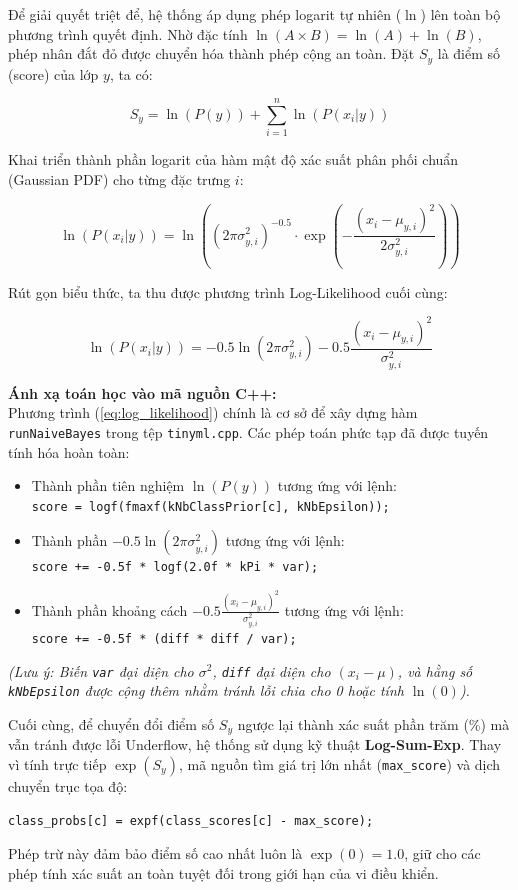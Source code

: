 Để giải quyết triệt để, hệ thống áp dụng phép logarit tự nhiên ($\ln$) lên toàn bộ phương trình quyết định. Nhờ đặc tính $\ln(A \times B) = \ln(A) + \ln(B)$, phép nhân đắt đỏ được chuyển hóa thành phép cộng an toàn. Đặt $S_y$ là điểm số (score) của lớp $y$, ta có:

\begin{equation}
S_y = \ln(P(y)) + \sum_{i=1}^{n} \ln(P(x_i|y))
\end{equation}

Khai triển thành phần logarit của hàm mật độ xác suất phân phối chuẩn (Gaussian PDF) cho từng đặc trưng $i$:

\begin{equation}
\ln(P(x_i|y)) = \ln\left( (2\pi\sigma_{y,i}^2)^{-0.5} \cdot \exp\left(-\frac{(x_i - \mu_{y,i})^2}{2\sigma_{y,i}^2}\right) \right)
\end{equation}

Rút gọn biểu thức, ta thu được phương trình Log-Likelihood cuối cùng:

\begin{equation}
\ln(P(x_i|y)) = -0.5 \ln(2\pi\sigma_{y,i}^2) - 0.5 \frac{(x_i - \mu_{y,i})^2}{\sigma_{y,i}^2}
\label{eq:log_likelihood}
\end{equation}

\textbf{Ánh xạ toán học vào mã nguồn C++:} \\
Phương trình (\ref{eq:log_likelihood}) chính là cơ sở để xây dựng hàm \texttt{runNaiveBayes} trong tệp \texttt{tinyml.cpp}. Các phép toán phức tạp đã được tuyến tính hóa hoàn toàn:
\begin{itemize}
    \item Thành phần tiên nghiệm $\ln(P(y))$ tương ứng với lệnh: \\ \texttt{score = logf(fmaxf(kNbClassPrior[c], kNbEpsilon));}
    \item Thành phần $-0.5 \ln(2\pi\sigma_{y,i}^2)$ tương ứng với lệnh: \\ \texttt{score += -0.5f * logf(2.0f * kPi * var);}
    \item Thành phần khoảng cách $-0.5 \frac{(x_i - \mu_{y,i})^2}{\sigma_{y,i}^2}$ tương ứng với lệnh: \\ \texttt{score += -0.5f * (diff * diff / var);}
\end{itemize}
\textit{(Lưu ý: Biến \texttt{var} đại diện cho $\sigma^2$, \texttt{diff} đại diện cho $(x_i - \mu)$, và hằng số \texttt{kNbEpsilon} được cộng thêm nhằm tránh lỗi chia cho 0 hoặc tính $\ln(0)$).}

Cuối cùng, để chuyển đổi điểm số $S_y$ ngược lại thành xác suất phần trăm (\%) mà vẫn tránh được lỗi Underflow, hệ thống sử dụng kỹ thuật \textbf{Log-Sum-Exp}. Thay vì tính trực tiếp $\exp(S_y)$, mã nguồn tìm giá trị lớn nhất (\texttt{max\_score}) và dịch chuyển trục tọa độ:
\begin{center}
    \texttt{class\_probs[c] = expf(class\_scores[c] - max\_score);}
\end{center}
Phép trừ này đảm bảo điểm số cao nhất luôn là $\exp(0) = 1.0$, giữ cho các phép tính xác suất an toàn tuyệt đối trong giới hạn của vi điều khiển.

